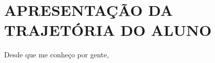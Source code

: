 \chapter[APRESENTAÇÃO DA TRAJETÓRIA DO ALUNO]{APRESENTAÇÃO DA TRAJETÓRIA DO ALUNO}

Desde que me conheço por gente,   
